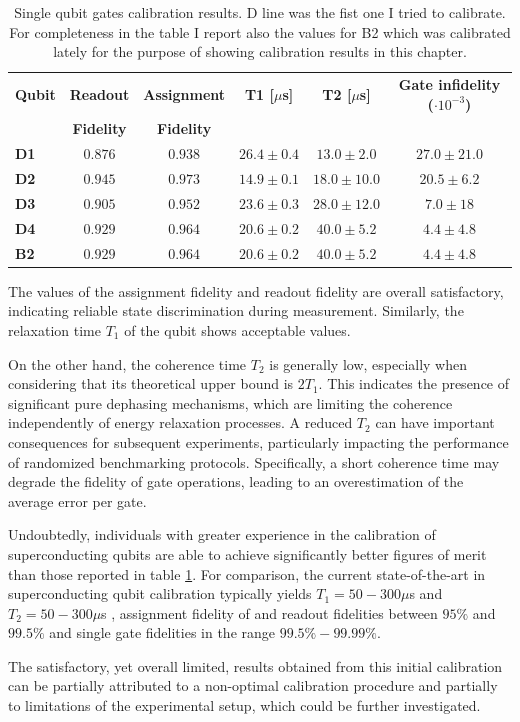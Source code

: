 \begin{table}[h]
    \centering
    \begin{tabular}{lccccc}
    \toprule
    \textbf{Qubit} & \multicolumn{1}{c}{\textbf{Readout}} & \multicolumn{1}{c}{\textbf{Assignment}} & \textbf{T1 [$\mu$s]} & \textbf{T2 [$\mu$s]} & \textbf{Gate infidelity ($\cdot 10^{-3}$)} \\
    \textbf{} & \textbf{Fidelity} & \textbf{Fidelity} & & & \\
    \midrule
    \textbf{D1} & $0.876$ & $0.938$ & $26.4 \pm 0.4$ & $13.0 \pm 2.0$ & $27.0 \pm 21.0$ \\
    \textbf{D2} & $0.945$ & $0.973$ & $14.9 \pm 0.1$ & $18.0 \pm 10.0$ & $20.5 \pm 6.2$ \\
    \textbf{D3} & $0.905$ & $0.952$ & $23.6 \pm 0.3$ & $28.0 \pm 12.0$ & $7.0 \pm 18$ \\
    \textbf{D4} & $0.929$ & $0.964$ & $20.6 \pm 0.2$ & $40.0 \pm 5.2$ & $4.4 \pm 4.8$ \\
    \textbf{B2} & $0.929$ & $0.964$ & $20.6 \pm 0.2$ & $40.0 \pm 5.2$ & $4.4 \pm 4.8$ \\
    \bottomrule
    \end{tabular}
    \caption{Single qubit gates calibration results. D line was the fist one I tried to calibrate.\\
    For completeness in the table I report also the values for B2 which was calibrated lately for the purpose of showing calibration results in this chapter.}
    \label{tab:cal_results}
\end{table}

The values of the assignment fidelity and readout fidelity are overall satisfactory, indicating reliable state discrimination during measurement. 
Similarly, the relaxation time $T_1$ of the qubit shows acceptable values.

On the other hand, the coherence time $T_2$ is generally low, especially when considering that its theoretical upper bound is $2T_1$. 
This indicates the presence of significant pure dephasing mechanisms, which are limiting the coherence independently of energy relaxation processes. 
A reduced $T_2$ can have important consequences for subsequent experiments, particularly impacting the performance of randomized benchmarking protocols. 
Specifically, a short coherence time may degrade the fidelity of gate operations, leading to an overestimation of the average error per gate.

Undoubtedly, individuals with greater experience in the calibration of superconducting qubits are able to achieve significantly better figures of merit than those reported in table \ref{tab:cal_results}.
For comparison, the current state-of-the-art in superconducting qubit calibration typically yields $T_1= 50-300 \mu$s \cite{Place2021-kc} and $T_2= 50-300 \mu$s \cite{Place2021-kc}, assignment fidelity of  and readout fidelities between $95\%$ and $99.5\%$ \cite{krantz_quantum_2019} and single gate fidelities in the range $99.5\% - 99.99\%$.

The satisfactory, yet overall limited, results obtained from this initial calibration can be partially attributed to a non-optimal calibration procedure and partially to limitations of the experimental setup, which could be further investigated.